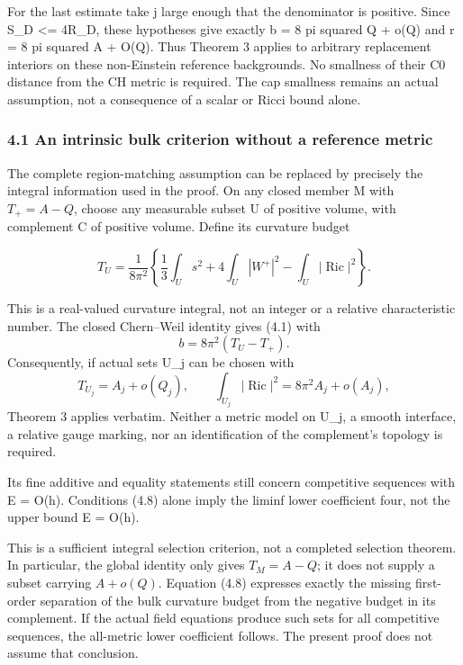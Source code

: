 \documentclass[
  10pt,
]{article}
\begin{document}
For the last estimate take j large enough that the denominator is
positive. Since S\_D \textless= 4R\_D, these hypotheses give exactly b =
8 pi squared Q + o(Q) and r = 8 pi squared A + O(Q). Thus Theorem 3
applies to arbitrary replacement interiors on these non-Einstein
reference backgrounds. No smallness of their C0 distance from the CH
metric is required. The cap smallness remains an actual assumption, not
a consequence of a scalar or Ricci bound alone.

\hypertarget{an-intrinsic-bulk-criterion-without-a-reference-metric}{%
\subsubsection{4.1 An intrinsic bulk criterion without a reference
metric}\label{an-intrinsic-bulk-criterion-without-a-reference-metric}}

The complete region-matching assumption can be replaced by precisely the
integral information used in the proof. On any closed member M with
\(T_+=A-Q\), choose any measurable subset U of positive volume, with
complement C of positive volume. Define its curvature budget

\[
 T_U=\frac1{8\pi^2}\left\{\frac13\int_U s^2
                   +4\int_U|W^+|^2-\int_U|\operatorname{Ric}|^2\right\}.
                                                               \tag{4.7}
\]

This is a real-valued curvature integral, not an integer or a relative
characteristic number. The closed Chern--Weil identity gives (4.1) with
\[
                  b=8\pi^2(T_U-T_+).
\] Consequently, if actual sets U\_j can be chosen with \[
 T_{U_j}=A_j+o(Q_j),\qquad
 \int_{U_j}|\operatorname{Ric}|^2=8\pi^2A_j+o(A_j),        \tag{4.8}
\] Theorem 3 applies verbatim. Neither a metric model on U\_j, a smooth
interface, a relative gauge marking, nor an identification of the
complement's topology is required.

Its fine additive and equality statements still concern competitive
sequences with E = O(h). Conditions (4.8) alone imply the liminf lower
coefficient four, not the upper bound E = O(h).

This is a sufficient integral selection criterion, not a completed
selection theorem. In particular, the global identity only gives
\(T_M=A-Q\); it does not supply a subset carrying \(A+o(Q)\). Equation
(4.8) expresses exactly the missing first-order separation of the bulk
curvature budget from the negative budget in its complement. If the
actual field equations produce such sets for all competitive sequences,
the all-metric lower coefficient follows. The present proof does not
assume that conclusion.
\end{document}
